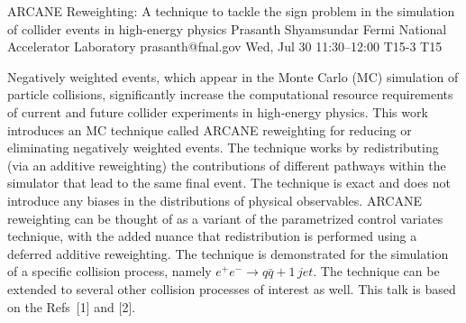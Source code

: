 \documentclass[12pt,lettersize,oneside]{book} %
\begin{document}
\begin{talk}
  {ARCANE Reweighting: A technique to tackle the sign problem in the simulation of collider events in high-energy physics}%
  {Prasanth Shyamsundar}%
  {Fermi National Accelerator Laboratory}%
  {prasanth@fnal.gov}%
  {}%
  {}%
  {Wed, Jul 30 11:30--12:00}%
  {T15-3}%
  {T15}%
  {}%
  
    
   

Negatively weighted events, which appear in the Monte Carlo (MC) simulation of particle collisions, significantly increase the computational resource requirements of current and future collider experiments in high-energy physics. This work introduces an MC technique called ARCANE reweighting for reducing or eliminating negatively weighted events. The technique works by redistributing (via an additive reweighting) the contributions of different pathways within the simulator that lead to the same final event. The technique is exact and does not introduce any biases in the distributions of physical observables. ARCANE reweighting can be thought of as a variant of the parametrized control variates technique, with the added nuance that redistribution is performed using a deferred additive reweighting. The technique is demonstrated for the simulation of a specific collision process, namely $e^+ e^- \longrightarrow q \bar{q} + 1\,jet$. The technique can be extended to several other collision processes of interest as well. This talk is based on the Refs~[1] and [2].

\medskip


\end{talk}
\end{document}
